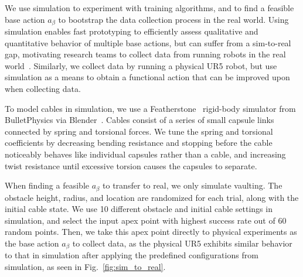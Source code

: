 We use simulation to experiment with training algorithms, and to find a feasible base action $a_\beta$ to bootstrap the data collection process in the real world.  Using simulation enables fast prototyping to efficiently assess qualitative and quantitative behavior of multiple base actions, but can suffer from a sim-to-real gap, motivating research teams to collect data from running robots in the real world~\cite{gupta2018,folding_fabric_fcn_2020}. Similarly, we collect data by running a physical UR5 robot, but use simulation as a means to obtain a functional action that can be improved upon when collecting data.

To model cables in simulation, we use a Featherstone~\cite{featherstone1984robot} rigid-body simulator from BulletPhysics via Blender~\cite{blender}. Cables consist of a series of small capsule links connected by spring and torsional forces. %
We tune the spring and torsional coefficients by decreasing bending resistance and stopping before the cable noticeably behaves like individual capsules rather than a cable, and increasing twist resistance until excessive torsion causes the capsules to separate.

When finding a feasible $a_\beta$ to transfer to real, we only simulate vaulting. The obstacle height, radius, and location are randomized for each trial, along with the initial cable state. We use 10 different obstacle and initial cable settings in simulation, and select the input apex point with highest success rate out of 60 random points. Then, we take this apex point directly to physical experiments as the base action $a_\beta$ to collect data, as the physical UR5 exhibits similar behavior to that in simulation after applying the predefined configurations from simulation, as seen in Fig.~\ref{fig:sim_to_real}.


